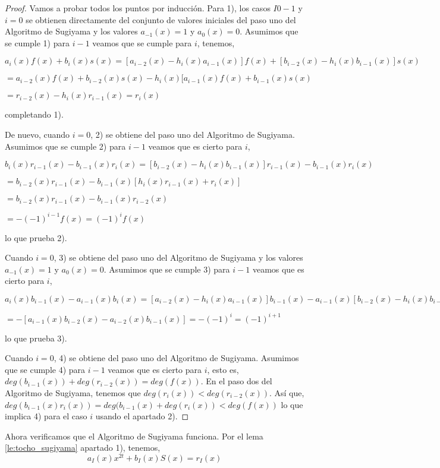 \begin{proof}
Vamos a probar todos los puntos por inducción. Para 1), los casos $I0-1$ y $i=0$ se obtienen directamente del conjunto de valores iniciales del paso uno del Algoritmo de Sugiyama y los valores $a_{-1}(x)=1$ y $a_0(x) = 0$. Asumimos que se cumple 1) para $i-1$ veamos que se cumple para $i$, tenemos, 

$a_i(x)f(x) + b_i(x)s(x) = [a_{i-2}(x) -h_i(x)a_{i-1}(x)]f(x) + [b_{i-2}(x) -h_i(x)b_{i-1}(x)]s(x)$

$ = a_{i-2}(x)f(x) + b_{i-2}(x)s(x) - h_i(x)[a_{i-1}(x)f(x) + b_{i-1}(x)s(x) $

$ = r_{i-2}(x)-h_i(x)r_{i-1}(x) = r_i(x)$

completando 1).

De nuevo, cuando $i=0$, 2) se obtiene del paso uno del Algoritmo de Sugiyama. Asumimos que se cumple 2) para $i-1$ veamos que es cierto para $i$,

$b_i(x)r_{i-1}(x) - b_{i-1}(x)r_i(x) = [b_{i-2}(x) -h_i(x)b_{i-1}(x)]r_{i-1}(x)-b_{i-1}(x)r_i(x)$

$ = b_{i-2}(x)r_{i-1}(x) - b_{i-1}(x)[h_i(x)r_{i-1}(x) + r_i(x)]$

$ = b_{i-2}(x)r_{i-1}(x) - b_{i-1}(x)r_{i-2}(x) $ 

$ = -(-1)^{i-1}f(x) = (-1)^if(x)$

lo que prueba 2).

Cuando $i=0$, 3) se obtiene del paso uno del Algoritmo de Sugiyama y los valores $a_{-1}(x)=1$ y $a_0(x) = 0$. Asumimos que se cumple 3) para $i-1$ veamos que es cierto para $i$,

$a_i(x)b_{i-1}(x) - a_{i-1}(x)b_i(x) = [a_{i-2}(x) -h_i(x)a_{i-1}(x)]b_{i-1}(x) - a_{i-1}(x)[b_{i-2}(x) -h_i(x)b_{i-1}(x)]$

$ = -[a_{i-1}(x)b_{i-2}(x) - a_{i-2}(x)b_{i-1}(x)] = -(-1)^i = (-1)^{i+1}$

lo que prueba 3).

Cuando $i=0$, 4) se obtiene del paso uno del Algoritmo de Sugiyama. Asumimos que se cumple 4) para $i-1$ veamos que es cierto para $i$, esto es,  $deg(b_{i-1}(x)) + deg(r_{i-2}(x)) = deg(f(x))$. En el paso dos del Algoritmo de Sugiyama, tenemos que $   deg(r_i(x)) < deg(r_{i-2}(x))$. Así que, $deg(b_{i-1}(x)r_i(x)) = deg(b_{i-1}(x) + deg(r_i(x)) < deg(f(x))$ lo que implica 4) para el caso $i$ usando el apartado 2).

\end{proof}

Ahora verificamos que el Algoritmo de Sugiyama funciona. Por el lema \ref{le:tocho_sugiyama} apartado 1), tenemos, 
\begin{equation}
\label{sugiyama_trece}
a_I(x)x^{2t} + b_I(x)S(x) = r_I(x)
\end{equation}

